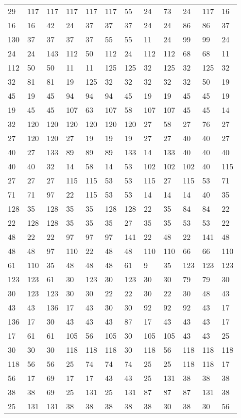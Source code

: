 \begin{longtable}{llllllllllll}
29 &117& 117 &117 &117& 117&55 &24& 73 &24 &117& 16\\
16 &16& 42 &24 &37& 37&37 &24& 24 &86 &86& 37\\
130 &37& 37 &37 &37& 55&55 &11& 24 &99 &99& 24\\
24 &24& 143 &112 &50& 112&24 &112& 112 &68 &68& 11\\
112 &50& 50 &11 &11& 125&125 &32& 125 &32 &125& 32\\
32 &81& 81 &19 &125& 32&32 &32& 32 &32 &50& 19\\
45 &19& 45 &94 &94& 94&45 &19& 19 &45 &45& 19\\
19 &45& 45 &107 &63& 107&58 &107& 107 &45 &45& 14\\
32 &120& 120 &120 &120& 120&120 &27& 58 &27 &76& 27\\
27 &120& 120 &27 &19& 19&19 &27& 27 &40 &40& 27\\
40 &27& 133 &89 &89& 89&133 &14& 133 &40 &40& 40\\
40 &40& 32 &14 &58& 14&53 &102& 102 &102 &40& 115\\
27 &27& 27 &115 &115& 53&53 &115& 27 &115 &53& 71\\
71 &71& 97 &22 &115& 53&53 &14& 14 &14 &40& 35\\
128 &35& 128 &35 &35& 128&128 &22& 35 &84 &84& 22\\
22 &128& 128 &35 &35& 35&27 &35& 35 &53 &53& 22\\
48 &22& 22 &97 &97& 97&141 &22& 48 &22 &141& 48\\
48 &48& 97 &110 &22& 48&48 &110& 110 &66 &66& 110\\
61 &110& 35 &48 &48& 48&61 &9& 35 &123 &123& 123\\
123 &123& 61 &30 &123& 30&123 &30& 30 &79 &79& 30\\
30 &123& 123 &30 &30& 22&22 &30& 22 &30 &48& 43\\
43 &43& 136 &17 &43& 30&30 &92& 92 &92 &43& 17\\
136 &17& 30 &43 &43& 43&87 &17& 43 &43 &43& 17\\
17 &61& 61 &105 &56& 105&30 &105& 105 &43 &43& 25\\
30 &30& 30 &118 &118& 118&30 &118& 56 &118 &118& 118\\
118 &56& 56 &25 &74& 74&74 &25& 25 &118 &118& 17\\
56 &17& 69 &17 &17& 43&43 &25& 131 &38 &38& 38\\
38 &38& 69 &25 &131& 25&131 &87& 87 &87 &131& 38\\
25 &131& 131 &38 &38& 38&38 &38& 30 &38 &30& 56\\

\end{longtable}
